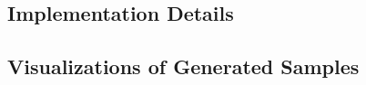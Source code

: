 \documentclass{article}
\begin{document}
\subsection{Implementation Details}

\subsection{Visualizations of Generated Samples}
\end{document}
